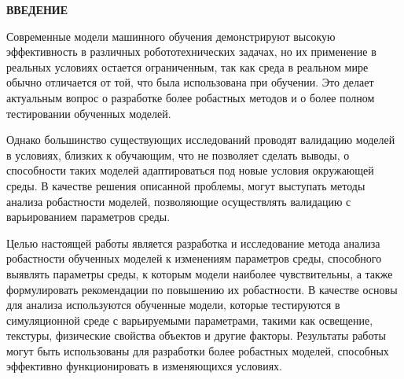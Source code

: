 





\newpage
\renewcommand{\contentsname}{\centerline{\large СОДЕРЖАНИЕ}}
\tableofcontents

\newpage
\begin{center}
  \textbf{\large ВВЕДЕНИЕ}
\end{center}

Современные модели машинного обучения демонстрируют высокую эффективность в различных робототехнических задачах, 
но их применение в реальных условиях остается ограниченным, так как среда в реальном мире обычно отличается от той, 
что была использована при обучении. Это делает актуальным вопрос о разработке более робастных методов и о более полном тестировании обученных моделей.


Однако большинство существующих исследований проводят валидацию моделей в условиях, близких к обучающим, 
что не позволяет сделать выводы, о способности таких моделей адаптироваться под новые условия окружающей среды. 
В качестве решения описанной проблемы, могут выступать методы анализа робастности моделей, позволяющие осуществлять валидацию с варьированием параметров среды.

Целью настоящей работы является разработка и исследование метода анализа робастности обученных моделей к изменениям параметров среды, 
способного выявлять параметры среды, к которым модели наиболее чувствительны, а также формулировать рекомендации по повышению их робастности. В качестве основы для анализа используются обученные модели, 
которые тестируются в симуляционной среде с варьируемыми параметрами, такими как освещение, текстуры, физические свойства объектов и другие факторы.
Результаты работы могут быть использованы для разработки более робастных моделей, способных эффективно функционировать в изменяющихся условиях.